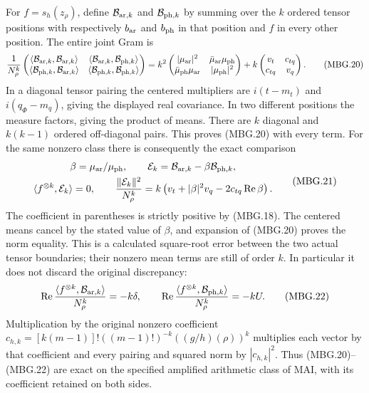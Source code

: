 For \(f=s_h(z_\rho)\), define \(\mathcal B_{{\rm ar},k}\) and
\(\mathcal B_{{\rm ph},k}\) by summing over the \(k\) ordered tensor
positions with respectively \(b_{\rm ar}\) and \(b_{\rm ph}\) in that
position and \(f\) in every other position. The entire joint Gram is
\[
 \frac1{N_\rho^k}
 \begin{pmatrix}
  \langle\mathcal B_{{\rm ar},k},\mathcal B_{{\rm ar},k}\rangle&
  \langle\mathcal B_{{\rm ar},k},\mathcal B_{{\rm ph},k}\rangle\\
  \langle\mathcal B_{{\rm ph},k},\mathcal B_{{\rm ar},k}\rangle&
  \langle\mathcal B_{{\rm ph},k},\mathcal B_{{\rm ph},k}\rangle
 \end{pmatrix}
 =
 k^2
 \begin{pmatrix}
  |\mu_{\rm ar}|^2&\bar\mu_{\rm ar}\mu_{\rm ph}\\
  \bar\mu_{\rm ph}\mu_{\rm ar}&|\mu_{\rm ph}|^2
 \end{pmatrix}
 +k\begin{pmatrix}v_t&c_{tq}\\c_{tq}&v_q\end{pmatrix}.
 \tag{MBG.20}\label{GraphV2:eq:mbg-joint-tensor}
\]
In a diagonal tensor pairing the centered multipliers are
\(i(t-m_t)\) and \(i(q_\Phi-m_q)\), giving the displayed real
covariance. In two different positions the measure factors, giving
the product of means. There are \(k\) diagonal and \(k(k-1)\)
ordered off-diagonal pairs. This proves (MBG.20) with every term.
For the same nonzero class there is consequently the exact comparison
\[
 \begin{gathered}
 \beta=\mu_{\rm ar}/\mu_{\rm ph},\qquad
 \mathcal E_k=\mathcal B_{{\rm ar},k}
                         -\beta\mathcal B_{{\rm ph},k},\\
 \langle f^{\otimes k},\mathcal E_k\rangle=0,\qquad
 \frac{\|\mathcal E_k\|^2}{N_\rho^k}
   =k\left(v_t+|\beta|^2v_q-2c_{tq}\operatorname{Re}\beta\right).
 \end{gathered}
 \tag{MBG.21}\label{GraphV2:eq:mbg-square-root-error}
\]
The coefficient in parentheses is strictly positive by (MBG.18).
The centered means cancel by the stated value of \(\beta\), and
expansion of (MBG.20) proves the norm equality. This is a calculated
square-root error between the two actual tensor boundaries; their
nonzero mean terms are still of order \(k\). In particular it does
not discard the original discrepancy:
\[
 \operatorname{Re}\frac{\langle f^{\otimes k},
                      \mathcal B_{{\rm ar},k}\rangle}{N_\rho^k}
     =-k\delta,\qquad
 \operatorname{Re}\frac{\langle f^{\otimes k},
                      \mathcal B_{{\rm ph},k}\rangle}{N_\rho^k}
     =-kU.
 \tag{MBG.22}\label{GraphV2:eq:mbg-mean-retained}
\]
Multiplication by the original nonzero coefficient
\(c_{h,k}=[k(m-1)]!((m-1)!)^{-k}((g/h)(\rho))^k\) multiplies
each vector by that coefficient and every pairing and squared norm
by \(|c_{h,k}|^2\). Thus (MBG.20)--(MBG.22) are exact on the
specified amplified arithmetic class of MAI, with its coefficient
retained on both sides.

